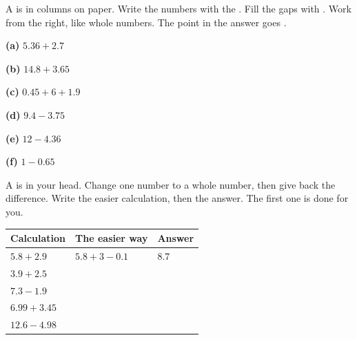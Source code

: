\documentclass[12pt,a4paper]{article}
\newif\iffr
\newcommand{\fr}[1]{\unskip\iffr\par\vspace{1pt}\noindent{\small\itshape\color{black!60}#1}\par\fi}
\newcommand{\wsq}[3][3.1cm]{%
  \begin{minipage}[t]{0.315\textwidth}
    \textbf{(#2)}\; $#3$
    \begin{workspace}[#1]\end{workspace}
  \end{minipage}}
\newcommand{\tall}{\rule[-0.6em]{0pt}{1.9em}}
\renewcommand{\tall}{\rule[-0.8em]{0pt}{2.4em}}
\begin{document}


\begin{remember}
  A  is in columns on paper. Write the numbers with the
  . Fill the gaps with . Work from the right, like
  whole numbers. The point in the answer goes .
  \fr{M\'ethode \'ecrite (\eng{written method})~: on pose le calcul en colonnes,
  virgule sous virgule, et on compl\`ete les cases vides avec des z\'eros. Dans le
  r\'esultat, la virgule descend tout droit (\eng{straight down}).}
\end{remember}

\vspace{4pt}
\noindent
\wsq[2.4cm]{a}{5.36 + 2.7}\hfill\wsq[2.4cm]{b}{14.8 + 3.65}\hfill\wsq[2.4cm]{c}{0.45 + 6 + 1.9}

\vspace{4pt}
\noindent
\wsq[2.4cm]{d}{9.4 - 3.75}\hfill\wsq[2.4cm]{e}{12 - 4.36}\hfill\wsq[2.4cm]{f}{1 - 0.65}


\noindent A  is in your head. Change one number to a whole
number, then give back the difference. Write the easier calculation, then the answer.
The first one is done for you.
\fr{Calcul mental (\eng{mental method})~: de t\^ete. Arrondis un des nombres \`a
l'unit\'e, puis corrige l'\'ecart. \'Ecris le calcul plus simple, puis le
r\'esultat. La premi\`ere ligne est faite pour toi.}

\vspace{4pt}
\noindent
\begin{tabularx}{\textwidth}{|C{3.0cm}|L|C{2.6cm}|}
  \hline
  \textbf{Calculation} & \textbf{The easier way} & \textbf{Answer} \\
  \hline
  $5.8 + 2.9$ \tall & $5.8 + 3 - 0.1$ & $8.7$ \\ \hline
  $3.9 + 2.5$ \tall & & \\ \hline
  $7.3 - 1.9$ \tall & & \\ \hline
  $6.99 + 3.45$ \tall & & \\ \hline
  $12.6 - 4.98$ \tall & & \\ \hline
\end{tabularx}
\end{document}
